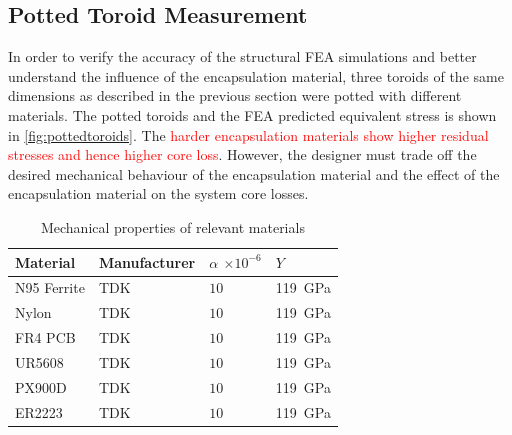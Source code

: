 \documentclass[conference]{IEEEtran}
\begin{document}
\subsection{Potted Toroid Measurement}

In order to verify the accuracy of the structural FEA simulations and better understand the influence of the encapsulation material, three toroids of the same dimensions as described in the previous section were potted with different materials.
The potted toroids and the FEA predicted equivalent stress is shown in \cref{fig:pottedtoroids}.
The \textcolor{red}{harder encapsulation materials show higher residual stresses and hence higher core loss}. 
However, the designer must trade off the desired mechanical behaviour of the encapsulation material and the effect of the encapsulation material on the system core losses. 

\begin{table}
  \centering
  \caption{Mechanical properties of relevant materials}
  \begin{tabular}{@{}llll@{}}
    \toprule
    Material & Manufacturer & $\alpha$ $\times 10^{-6}$ & $Y$ \\ \midrule
    N95 Ferrite & TDK & $10$ & \SI{119}{\giga\pascal} \\
    Nylon & TDK & $10$ & \SI{119}{\giga\pascal} \\
    FR4 PCB & TDK & $10$ & \SI{119}{\giga\pascal} \\
    UR5608 & TDK & $10$ & \SI{119}{\giga\pascal} \\
    PX900D & TDK & $10$ & \SI{119}{\giga\pascal} \\
    ER2223 & TDK & $10$ & \SI{119}{\giga\pascal} \\
    \bottomrule
  \end{tabular}
\end{table}
\end{document}
